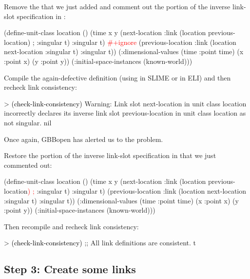 \documentclass[10pt,twoside,english,pdftex]{article}
\begin{document}
Remove the  that we just added and comment out the
 portion of the inverse link-slot specification in 
:
%
\begin{example}\color{darkergray}%
  (define-unit-class location ()
    (time 
     x y
     (next-location
      :link (location previous-location\textcolor{black}{) ;} :singular t) 
      :singular t)
      \textcolor{red}{#+ignore}     
     (previous-location
      :link (location next-location :singular t)  
      :singular t))
    (:dimensional-values
      (time :point time)
      (x :point x)
      (y :point y))
    (:initial-space-instances (known-world)))
\end{example}

Compile the again-defective definition (using  in SLIME or
 in ELI) and then recheck link consistency:
%
\begin{example}\color{darkergray}%
  > \textcolor{black}{(check-link-consistency)}
  Warning: Link slot next-location in unit class location incorrectly 
           declares its inverse link slot previous-location in unit 
           class location as not singular.
nil
\end{example}
%
Once again, GBBopen has alerted us to the problem.

Restore the  portion of the inverse link-slot
specification in  that we just commented out:
%
\begin{example}\color{darkergray}%
  (define-unit-class location ()
    (time 
     x y
     (next-location
      :link (location previous-location\textcolor{red}{) ;} :singular t) 
      :singular t)
     (previous-location
      :link (location next-location :singular t)  
      :singular t))
    (:dimensional-values
      (time :point time)
      (x :point x)
      (y :point y))
    (:initial-space-instances (known-world)))
\end{example}

Then recompile and recheck link consistency:
%
\begin{example}\color{darkergray}%
  > \textcolor{black}{(check-link-consistency)}
  ;; All link definitions are consistent.
  t
\end{example}

\subsection*{Step 3: Create some links}
\end{document}
